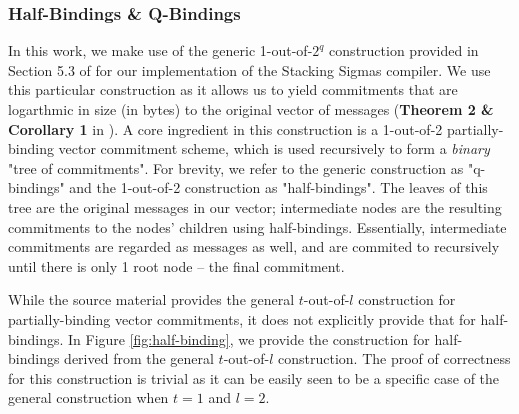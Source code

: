 \begin{definition}



\end{definition}


\subsubsection{Half-Bindings \& Q-Bindings}
In this work, we make use of the generic 1-out-of-$2^q$ construction provided in Section 5.3 of \cite{StackingSigmas} 
for our implementation of the Stacking Sigmas compiler. We use this 
particular construction as it allows us to yield commitments that are logarthmic in size (in bytes) to the original 
vector of messages (\textbf{Theorem 2 \& Corollary 1} in \cite{StackingSigmas}).
A core ingredient in this construction is a 1-out-of-2 partially-binding vector commitment scheme, which is used recursively 
to form a \textit{binary} "tree of commitments". 
For brevity, we refer to the generic construction as "q-bindings" and the 1-out-of-2 construction as "half-bindings".
The leaves of this tree are the original messages in our vector; intermediate nodes are the resulting commitments to the 
nodes' children using half-bindings. 
Essentially, intermediate commitments are regarded as messages as well, and are commited to recursively until there is only 
1 root node -- the final commitment. 

While the source material provides the general $t$-out-of-$l$ construction for partially-binding vector commitments, 
it does not explicitly provide that for half-bindings. 
In Figure \ref{fig:half-binding}, we provide the construction for half-bindings derived from the general $t$-out-of-$l$ 
construction. 
The proof of correctness for this construction is trivial as it can be easily seen to be a specific case of the general 
construction when $t = 1$ and $l = 2$. 

